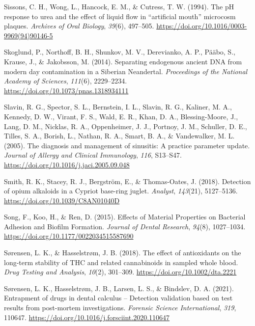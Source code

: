 \documentclass[
  letterpaper,
]{book}
\newlength{\cslhangindent}
\newlength{\cslentryspacingunit} %
\newenvironment{CSLReferences}[2] %
 {%
  \setlength{\parindent}{0pt}
  \ifodd #1
  \let\oldpar\par
  \def\par{\hangindent=\cslhangindent\oldpar}
  \fi
  \setlength{\parskip}{#2\cslentryspacingunit}
 }%
 {}
\begin{document}
\begin{CSLReferences}{1}{0}
\leavevmode{}%
Sissons, C. H., Wong, L., Hancock, E. M., \& Cutress, T. W. (1994). The
{pH} response to urea and the effect of liquid flow in {``artificial
mouth''} microcosm plaques. \emph{Archives of Oral Biology},
\emph{39}(6), 497--505.
\url{https://doi.org/10.1016/0003-9969(94)90146-5}

\leavevmode{}%
Skoglund, P., Northoff, B. H., Shunkov, M. V., Derevianko, A. P., Pääbo,
S., Krause, J., \& Jakobsson, M. (2014). Separating endogenous ancient
{DNA} from modern day contamination in a {Siberian Neandertal}.
\emph{Proceedings of the National Academy of Sciences}, \emph{111}(6),
2229--2234. \url{https://doi.org/10.1073/pnas.1318934111}

\leavevmode{}%
Slavin, R. G., Spector, S. L., Bernstein, I. L., Slavin, R. G., Kaliner,
M. A., Kennedy, D. W., Virant, F. S., Wald, E. R., Khan, D. A.,
Blessing-Moore, J., Lang, D. M., Nicklas, R. A., Oppenheimer, J. J.,
Portnoy, J. M., Schuller, D. E., Tilles, S. A., Borish, L., Nathan, R.
A., Smart, B. A., \& Vandewalker, M. L. (2005). The diagnosis and
management of sinusitis: {A} practice parameter update. \emph{Journal of
Allergy and Clinical Immunology}, \emph{116}, S13--S47.
\url{https://doi.org/10.1016/j.jaci.2005.09.048}

\leavevmode{}%
Smith, R. K., Stacey, R. J., Bergström, E., \& Thomas-Oates, J. (2018).
Detection of opium alkaloids in a {Cypriot} base-ring juglet.
\emph{Analyst}, \emph{143}(21), 5127--5136.
\url{https://doi.org/10.1039/C8AN01040D}

\leavevmode{}%
Song, F., Koo, H., \& Ren, D. (2015). Effects of {Material Properties}
on {Bacterial Adhesion} and {Biofilm Formation}. \emph{Journal of Dental
Research}, \emph{94}(8), 1027--1034.
\url{https://doi.org/10.1177/0022034515587690}

\leavevmode{}%
Sørensen, L. K., \& Hasselstrøm, J. B. (2018). The effect of
antioxidants on the long-term stability of {THC} and related
cannabinoids in sampled whole blood. \emph{Drug Testing and Analysis},
\emph{10}(2), 301--309. \url{https://doi.org/10.1002/dta.2221}

\leavevmode{}%
Sørensen, L. K., Hasselstrøm, J. B., Larsen, L. S., \& Bindslev, D. A.
(2021). Entrapment of drugs in dental calculus -- {Detection} validation
based on test results from post-mortem investigations. \emph{Forensic
Science International}, \emph{319}, 110647.
\url{https://doi.org/10.1016/j.forsciint.2020.110647}


\end{CSLReferences}
\end{document}
